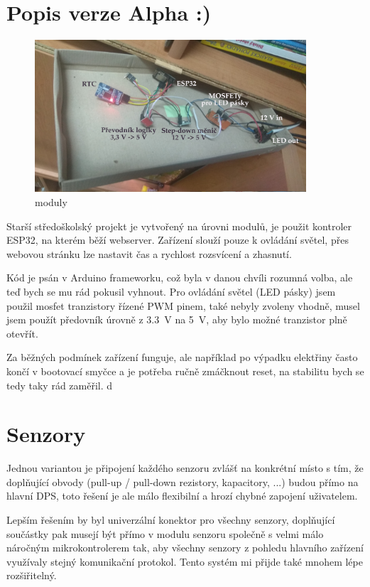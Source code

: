 \documentclass{customarticle}
\begin{document}
\clearpage
\section*{Popis verze Alpha :)}
	\begin{figure}[!h]
		\centering
		\includegraphics[width=0.9\textwidth]{moduly.jpg}
		\caption{moduly}
		\label{fig:moduly}
	\end{figure}
	Starší středoškolský projekt je vytvořený na úrovni modulů, je použit kontroler ESP32, na kterém běží webserver. Zařízení slouží pouze k ovládání světel, přes webovou stránku lze nastavit čas a rychlost rozsvícení a zhasnutí. 
	
	Kód je psán v Arduino frameworku, což byla v danou chvíli rozumná volba, ale teď bych se mu rád pokusil vyhnout. 
	Pro ovládání světel (LED pásky) jsem použil mosfet tranzistory řízené PWM pinem, také nebyly zvoleny vhodně, musel jsem použít předovník úrovně z \qty{3.3}{\volt} na \qty{5}{\volt}, aby bylo možné tranzistor plně otevřít.

	Za běžných podmínek zařízení funguje, ale například po výpadku elektřiny často končí v bootovací smyčce a je potřeba ručně zmáčknout reset, na stabilitu bych se tedy taky rád zaměřil.
d


	\section*{Senzory}
	Jednou variantou je připojení každého senzoru zvlášť na konkrétní místo s tím, že doplňující obvody (pull-up / pull-down rezistory, kapacitory, ...) budou přímo na hlavní DPS, toto řešení je ale málo flexibilní a hrozí chybné zapojení uživatelem.

	Lepším řešením by byl univerzální konektor pro všechny senzory, doplňující součástky pak musejí být přímo v modulu senzoru společně s velmi málo náročným mikrokontrolerem tak, aby všechny senzory z pohledu hlavního zařízení využívaly stejný komunikační protokol. Tento systém mi přijde také mnohem lépe rozšiřitelný.
	
\end{document}
